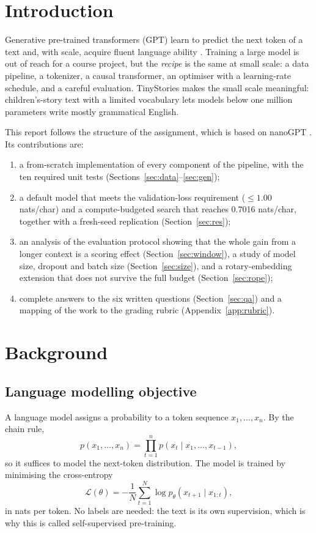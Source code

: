 \documentclass[10pt,twocolumn]{article}
\begin{document}
\section{Introduction}
Generative pre-trained transformers (GPT) learn to predict the next token of a text and, with scale, acquire fluent language ability \cite{radford2019,vaswani2017}. Training a large model is out of reach for a course project, but the \emph{recipe} is the same at small scale: a data pipeline, a tokenizer, a causal transformer, an optimiser with a learning-rate schedule, and a careful evaluation. TinyStories \cite{eldan2023} makes the small scale meaningful: children's-story text with a limited vocabulary lets models below one million parameters write mostly grammatical English.

This report follows the structure of the assignment, which is based on nanoGPT \cite{karpathy2022}. Its contributions are:
\begin{enumerate}
\item a from-scratch implementation of every component of the pipeline, with the ten required unit tests (Sections~\ref{sec:data}--\ref{sec:gen});
\item a default model that meets the validation-loss requirement ($\le1.00$ nats/char) and a compute-budgeted search that reaches 0.7016 nats/char, together with a fresh-seed replication (Section~\ref{sec:res});
\item an analysis of the evaluation protocol showing that the whole gain from a longer context is a scoring effect (Section~\ref{sec:window}), a study of model size, dropout and batch size (Section~\ref{sec:size}), and a rotary-embedding extension that does not survive the full budget (Section~\ref{sec:rope});
\item complete answers to the six written questions (Section~\ref{sec:qa}) and a mapping of the work to the grading rubric (Appendix~\ref{app:rubric}).
\end{enumerate}

\section{Background}
\subsection{Language modelling objective}
A language model assigns a probability to a token sequence $x_1,\dots,x_n$. By the chain rule,
\begin{equation}
p(x_1,\dots,x_n)=\prod_{t=1}^{n}p(x_t\mid x_1,\dots,x_{t-1}),
\end{equation}
so it suffices to model the next-token distribution. The model is trained by minimising the cross-entropy
\begin{equation}
\mathcal{L}(\theta)=-\frac1N\sum_{t=1}^{N}\log p_\theta(x_{t+1}\mid x_{1:t}),
\end{equation}
in nats per token. No labels are needed: the text is its own supervision, which is why this is called self-supervised pre-training.
\end{document}
